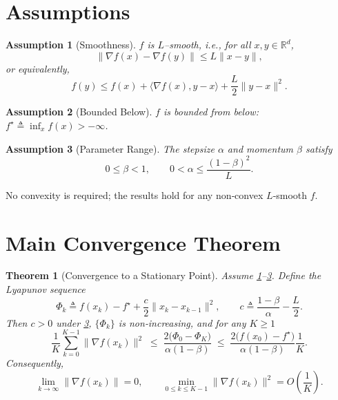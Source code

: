 \documentclass{article}
\newtheorem{theorem}{Theorem}
\newtheorem{assumption}{Assumption}
\newcommand{\grad}{\nabla}
\begin{document}
\section*{Assumptions}
\begin{assumption}[Smoothness]\label{as:smooth}
$f$ is $L$–smooth, i.e., for all $x,y\in\mathbb{R}^d$,
\[
\|\grad f(x)-\grad f(y)\|\le L\|x-y\|,
\]
or equivalently,
\[
f(y)\le f(x)+\langle\grad f(x),y-x\rangle+\frac{L}{2}\|y-x\|^2 .
\tag{A1}
\]
\end{assumption}

\begin{assumption}[Bounded Below]\label{as:bound}
$f$ is bounded from below: $f^\star\triangleq\inf_{x}f(x)>-\infty$.
\end{assumption}

\begin{assumption}[Parameter Range]\label{as:param}
The stepsize $\alpha$ and momentum $\beta$ satisfy
\[
0\le\beta<1,\qquad
0<\alpha\le\frac{(1-\beta)^2}{L}.
\tag{A3}
\]
\end{assumption}

No convexity is required; the results hold for any non‑convex $L$‑smooth $f$.

\section*{Main Convergence Theorem}
\begin{theorem}[Convergence to a Stationary Point]\label{thm:main}
Assume \ref{as:smooth}–\ref{as:param}.  
Define the Lyapunov sequence
\[
\Phi_k\triangleq f(x_k)-f^\star+\frac{c}{2}\|x_k-x_{k-1}\|^2,
\qquad 
c\triangleq\frac{1-\beta}{\alpha}-\frac{L}{2}.
\]
Then $c>0$ under \ref{as:param}, $\{\Phi_k\}$ is non‑increasing, and for any $K\ge 1$
\[
\frac{1}{K}\sum_{k=0}^{K-1}\|\grad f(x_k)\|^2
\;\le\;
\frac{2\bigl(\Phi_0-\Phi_K\bigr)}{\alpha(1-\beta)} 
\;\le\;
\frac{2\bigl(f(x_0)-f^\star\bigr)}{\alpha(1-\beta)}\frac{1}{K}.
\tag{1}
\]
Consequently,
\[
\lim_{k\to\infty}\|\grad f(x_k)\|=0,
\qquad 
\min_{0\le k\le K-1}\|\grad f(x_k)\|^2 = O\!\left(\frac{1}{K}\right).
\]
\end{theorem}
\end{document}
